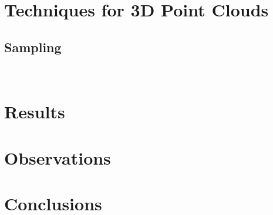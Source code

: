 \documentclass[12pt]{article}
\begin{document}
\section{Techniques for 3D Point Clouds}

\subsection{Sampling}

\

\section{Results}


\section{Observations}


\section{Conclusions}

\appendix



\end{document}

